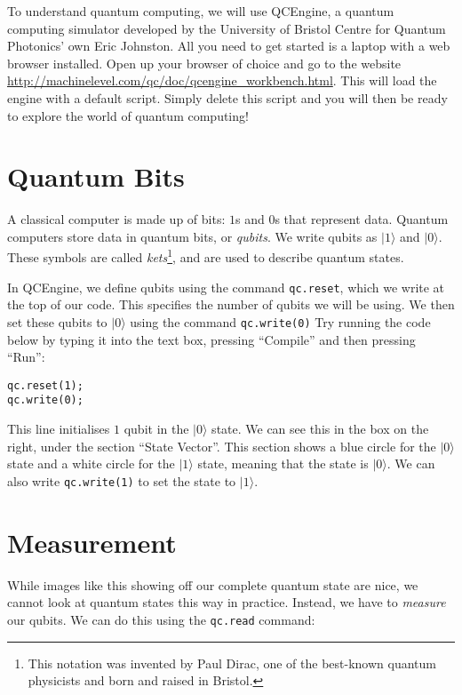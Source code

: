 \documentclass[twocolumn]{article}
\begin{document}
To understand quantum computing, we will use QCEngine, a quantum computing simulator developed by the University of Bristol Centre for Quantum Photonics' own Eric Johnston. All you need to get started is a laptop with a web browser installed. Open up your browser of choice and go to the website \url{http://machinelevel.com/qc/doc/qcengine_workbench.html}. This will load the engine with a default script. Simply delete this script and you will then be ready to explore the world of quantum computing!

\section{Quantum Bits}

A classical computer is made up of bits: $1$s and $0$s that represent data. Quantum computers store data in quantum bits, or {\em qubits}. We write qubits as $|1\rangle$ and $|0\rangle$. These symbols are called {\em kets}\footnote{This notation was invented by Paul Dirac, one of the best-known quantum physicists and born and raised in Bristol.}, and are used to describe quantum states.

In QCEngine, we define qubits using the command \texttt{qc.reset}, which we write at the top of our code. This specifies the number of qubits we will be using. We then set these qubits to $|0\rangle$ using the command \texttt{qc.write(0)} Try running the code below by typing it into the text box, pressing ``Compile'' and then pressing ``Run'':

\begin{lstlisting}
qc.reset(1);
qc.write(0);
\end{lstlisting}

This line initialises $1$ qubit in the $|0\rangle$ state. We can see this in the box on the right, under the section ``State Vector''. This section shows a blue circle for the $|0\rangle$ state and a white circle for the $|1\rangle$ state, meaning that the state is $|0\rangle$. We can also write \texttt{qc.write(1)} to set the state to $|1\rangle$.

\section{Measurement}

While images like this showing off our complete quantum state are nice, we cannot look at quantum states this way in practice. Instead, we have to {\em measure} our qubits. We can do this using the \texttt{qc.read} command:
\end{document}
